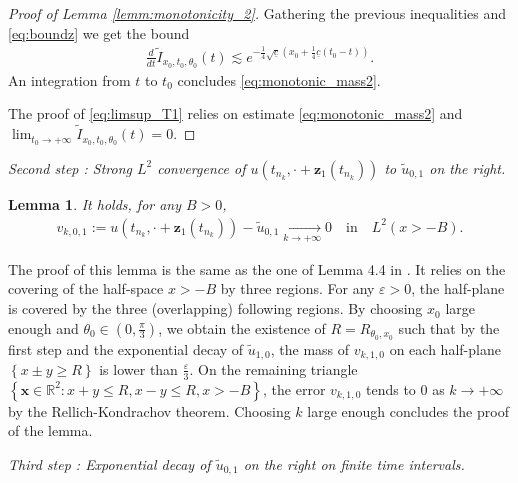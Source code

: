 \documentclass[reqno,10pt]{amsart}
\newtheorem{lemm}{Lemma}[section]
\numberwithin{equation}{section}
\newcommand{\bx}{\mathbf{x}}
\newcommand{\bz}{\mathbf{z}}
\begin{document}
\begin{proof}[Proof of Lemma \ref{lemm:monotonicity_2}]
	Gathering the previous inequalities and \eqref{eq:boundz} we get the bound
	\begin{align*}
		\frac{d}{dt} \tilde{I}_{x_0,t_0,\theta_0}(t) \lesssim e^{-\frac14 \sqrt{\underline{c}} \left( x_0 + \frac14 \underline{c} (t_0-t)\right)}.
	\end{align*}
	An integration from $t$ to $t_0$ concludes \eqref{eq:monotonic_mass2}.
	
	The proof of \eqref{eq:limsup_T1} relies on estimate \eqref{eq:monotonic_mass2} and $\lim_{t_0 \rightarrow +\infty} \tilde{I}_{x_0,t_0,\theta_0}(t) =0$.
	\end{proof}
		
		\vspace{0.5cm}
  \noindent \textit{Second step : Strong $L^2$ convergence of $u(t_{n_k}, \cdot + \bz_1(t_{n_k}))$ to $\tilde{u}_{0,1}$ on the right.}
		
		\begin{lemm}\label{lemm:step2}
			It holds, for any $B>0$,
			\begin{align*}
				v_{k,0,1}:= u \left(t_{n_k}, \cdot + \bz_1(t_{n_k}) \right)- \tilde{u}_{0,1} \underset{k\rightarrow +\infty}{\rightarrow} 0 \quad \text{in} \quad L^2(x>-B).
			\end{align*}
		\end{lemm}
		
		The proof of this lemma is the same as the one of Lemma 4.4 in \cite{CMPS16}. It relies on the covering of the half-space ${x>-B}$ by three regions. For any $\varepsilon>0$, the half-plane is covered by the three (overlapping) following regions. By choosing $x_0$ large enough and $\theta_0\in (0,\frac{\pi}{3})$, we obtain the existence of $R=R_{\theta_0,x_0}$ such that by the first step and the exponential decay of $\tilde{u}_{1,0}$,  the mass of $v_{k,1,0}$ on each half-plane $\left\{ x\pm y\geq R \right\} $ is lower than $\frac{\varepsilon}{3}$. On the remaining triangle $\left\{ \bx \in \mathbb{R}^2 : x+y \leq R, x-y \leq R, x >-B \right\}$, the error $v_{k,1,0}$ tends to $0$ as $k\rightarrow +\infty$ by the Rellich-Kondrachov theorem. Choosing $k$ large enough concludes the proof of the lemma.
		
		\vspace{0.5cm}
  \noindent \textit{Third step : Exponential decay of $\tilde{u}_{0,1}$ on the right on finite time intervals.}
		
\end{document}
